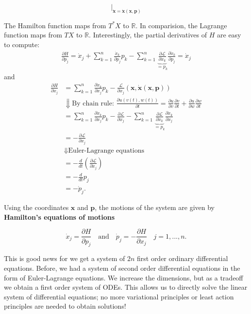 \documentclass[hidelinks,a4paper, 11pt]{article}
\theoremstyle{plain}
\theoremstyle{break}
\theoremstyle{plain}
\theoremstyle{definition}
\begin{document}
{\begin{framed}
\[		 \Big |_{\mathbf{\dot x} = \mathbf{\dot x}(\mathbf x, \mathbf p)}
	\]
\end{framed}
The Hamilton function maps from $T^*X$ to $\mathbb R$. In comparision, the Lagrange function maps from $TX$ to $\mathbb R$. Interestingly, the partial derivatives of $H$ are easy to compute:
\begin{align*}
\frac{\partial H}{\partial p_j} = \dot x_j + \sum^n_{k=1} \frac{\dot x_k}{\partial p_j}p_k - \sum^n_{k=1} \underbrace{\frac{\partial \mathcal L}{\partial \dot x_k}}_{=p_k} \frac{\partial \dot x_k}{\partial p_j} = \dot x_j
\end{align*}
and
\begin{align*}
\frac{\partial H}{\partial x_j} &= \sum^n_{k=1} \frac{\partial \dot x_k}{\partial x_j}p_k - \frac{\mathcal L}{\partial x_j}(\mathbf x, \mathbf{\dot x}(\mathbf x, \mathbf p))\\
&\Downarrow \text{By chain rule: $\frac{\partial u(v(t),w(t))}{\partial t} = \frac{\partial u}{\partial v} \frac{\partial v}{\partial t} + \frac{\partial u}{\partial w}\frac{\partial w}{\partial t}$}\\
 &= \sum^n_{k=1} \frac{\partial \dot x_k}{\partial x_j}p_k - \frac{\partial \mathcal L}{\partial x_j} - \sum^n_{k=1} \underbrace{\frac{\partial \mathcal L}{\partial \dot x_k}}_{=p_k} \frac{\partial \dot x_k}{\partial x_j}  \\
 &= - \frac{\partial \mathcal L}{\partial x_j} \\
 &\Downarrow \text{Euler-Lagrange equations}\\
 &= - \frac{d}{dt}\left( \frac{\partial \mathcal L}{\partial \dot x_j}\right)\\
 &= - \frac{d}{dt}p_j\\
 &= - \dot p_j.
\end{align*}

Using the coordinates $\mathbf x$ and $\mathbf p$, the motions of the system are given by \textbf{Hamilton's equations of motions}
\begin{framed}
	\[
		\dot x_j = \frac{\partial H}{\partial p_j} \quad \text{and} \quad \dot p_j = -\frac{\partial H}{\partial x_j} \quad j = 1,...,n.
	\]
\end{framed}

This is good news for we get a system of $2n$ first order ordinary differential equations. Before, we had a system of second order differential equations in the form of Euler-Lagrange equations. We increase the dimensions, but as a tradeoff we obtain a first order system of ODEs. This allows us to directly solve the linear system of differential equations; no more variational principles or least action principles are needed to obtain solutions!

}
\end{document}
